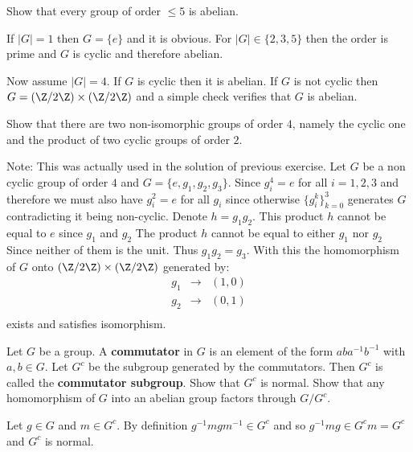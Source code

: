\documentclass[12pt]{book}
\newcommand{\Zm}[1]{\Z/#1\Z} %
\newcommand{\eG}{\ensuremath{\{e\}}}
\newcounter{myenumi}
\newenvironment{myenumerate}
{\begin{enumerate}
 \setcounter{enumi}{\themyenumi}
}
{\setcounter{myenumi}{\theenumi}
 \end{enumerate}}
\begin{document}
\begin{myenumerate}
\addtolength{\itemsep}{10pt}

\begin{excopy}
Show that every group of order \(\leq 5\) is abelian.
\end{excopy}

If \(|G|=1\) then \(G=\eG\) and it is obvious.
For \(|G|\in\{2,3,5\}\) then the order is prime and $G$ is cyclic
and therefore abelian.

Now assume \(|G|=4\). If $G$ is cyclic then it is abelian.
If $G$ is not cyclic then \(G=(\Zm{2})\times(\Zm{2})\)
and a simple check verifies that $G$ is abelian.

\begin{excopy}
Show that there are two non-isomorphic groups of order $4$,
namely the cyclic one and the product of two cyclic groups of order $2$.
\end{excopy}

Note: This was actually used in the solution of previous exercise.
Let $G$ be a non cyclic group of order $4$ and
\(G = \{e, g_1, g_2, g_3\}\).
Since \(g_i^4=e\) for all \(i=1,2,3\) and therefore we must also
have \(g_i^2=e\) for all \(g_i\) since otherwise \(\{g_i^k\}_{k=0}^3\)
generates $G$ contradicting it being non-cyclic.
Denote \(h = g_1 g_2\). This product $h$
 cannot be equal to $e$ since \(g_1\)  and \(g_2\)
The product $h$ cannot be equal to either \(g_1\) nor \(g_2\)
Since neither of them is the unit.
Thus \(g_1 g_2 = g_3\). With this the homomorphism
of $G$ onto \((\Zm{2})\times(\Zm{2})\)
generated by:
\begin{eqnarray*}
 g_1 & \rightarrow &  (1,0) \\
 g_2 & \rightarrow &  (0,1) \\
\end{eqnarray*}
exists and satisfies isomorphism.


\begin{excopy}
Let $G$ be a group. A \textbf{commutator} in $G$ is
an element of the form \(aba^{-1}b^{-1}\) with \(a,b\in G\).
Let \(G^c\) be the subgroup generated by the commutators.
Then \(G^c\) is called the \textbf{commutator subgroup}.
Show that \(G^c\) is normal. Show that any homomorphism of
$G$ into an abelian group factors through \(G/G^c\).
\end{excopy}

Let \(g\in G\) and \(m\in G^c\).
By definition \(g^{-1}mgm^{-1} \in G^c\) and so
\(g^{-1}mg \in G^c m = G^c\) and \(G^c\) is normal.


\end{myenumerate}
\end{document}
